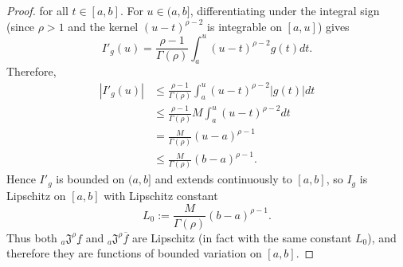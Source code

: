 \documentclass[a4paper,12pt,reqno]{amsart}
\numberwithin{equation}{section}
\theoremstyle{definition}
\theoremstyle{remark}
\numberwithin{equation}{section}
\begin{document}
\begin{proof}
for all $t\in[a,b]$. For $u\in(a,b]$, differentiating under the integral
sign (since $\rho>1$ and the kernel
$(u-t)^{\rho-2}$ is integrable on $[a,u]$) gives
$$I'_g(u)
=
\frac{\rho-1}{\Gamma(\rho)}
\int_{a}^{u}(u-t)^{\rho-2}g(t)dt.$$
Therefore,
\begin{align*}
    |I'_g(u)|
&\le
\frac{\rho-1}{\Gamma(\rho)}
\int_{a}^{u}(u-t)^{\rho-2}|g(t)|dt
\\& \le
\frac{\rho-1}{\Gamma(\rho)}M\int_{a}^{u}(u-t)^{\rho-2}dt \\& =\frac{M}{\Gamma(\rho)}(u-a)^{\rho-1}
\\& \le
\frac{M}{\Gamma(\rho)}(b-a)^{\rho-1}.
\end{align*}
Hence $I'_g$ is bounded on $(a,b]$ and extends continuously to $[a,b]$,
so $I_g$ is Lipschitz on $[a,b]$ with Lipschitz constant
\[
L_0:=\frac{M}{\Gamma(\rho)}(b-a)^{\rho-1}.
\]
Thus both ${}_{a}\mathfrak{J}^{\rho}\underline f$ and
${}_{a}\mathfrak{J}^{\rho}\overline f$ are Lipschitz (in fact with the same
constant $L_0$), and therefore they are functions of bounded variation on
$[a,b]$.


\end{proof}
\end{document}
